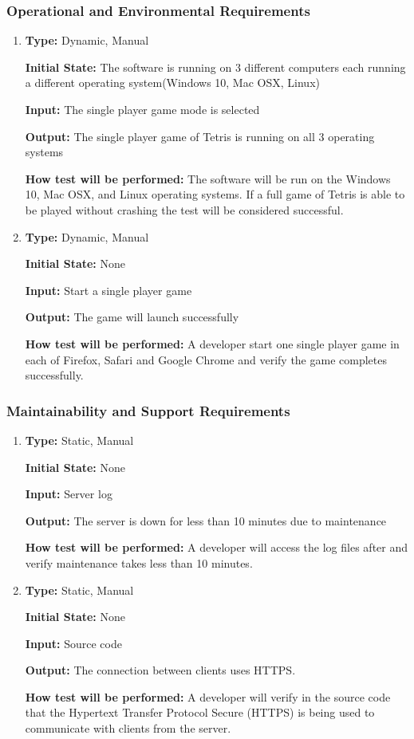 \documentclass[12pt, titlepage]{article}
\begin{document}
	\subsubsection{Operational and Environmental Requirements}
	\begin{enumerate}
		\item
		\textbf{Type:} Dynamic, Manual
		
		\textbf{Initial State:} The software is running on 3 different computers each running a different operating system(Windows 10, Mac OSX, Linux)
		
		\textbf{Input:} The single player game mode is selected 
		
		\textbf{Output:} The single player game of Tetris is running on all 3 operating systems
		
		\textbf{How test will be performed:} The software will be run on the Windows 10, Mac OSX, and Linux operating systems. If a full game of Tetris is able to be played without crashing the test will be considered successful. 
		
		\item
		\textbf{Type:} Dynamic, Manual
		
		\textbf{Initial State:} None
		
		\textbf{Input:} Start a single player game
		
		\textbf{Output:} The game will launch successfully
		
		\textbf{How test will be performed:} A developer start one single player game in each of Firefox, Safari and Google Chrome and verify the game completes successfully.
		
	\end{enumerate}
	
	\subsubsection{Maintainability and Support Requirements}
	\begin{enumerate}
		\item
		\textbf{Type:} Static, Manual
		
		\textbf{Initial State:} None
		
		\textbf{Input:} Server log
		
		\textbf{Output:} The server is down for less than 10 minutes due to maintenance
		
		\textbf{How test will be performed:} A developer will access the log files after and verify maintenance takes less than 10 minutes.
		
		\item
		\textbf{Type:} Static, Manual
		
		\textbf{Initial State:} None
		
		\textbf{Input:} Source code
		
		\textbf{Output:} The connection between clients uses HTTPS.
		
		\textbf{How test will be performed:} A developer will verify in the source code that the Hypertext Transfer Protocol Secure (HTTPS) is being used to communicate with clients from the server.
		
	\end{enumerate}
\end{document}
